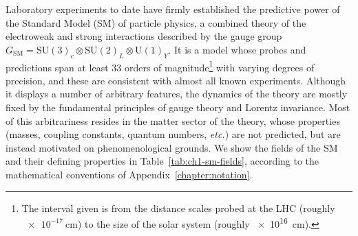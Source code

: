 Laboratory experiments to date have firmly established the predictive power of
the Standard Model (SM) of particle physics, a combined theory of the
electroweak and strong interactions described by the gauge group
$G_{\text{SM}} = \mathrm{SU}(3)_{c} \otimes \mathrm{SU}(2)_{L} \otimes \mathrm{U}(1)_{Y}$.
It is a model whose probes and predictions span at least 33 orders of
magnitude\footnote{The interval given is from the distance scales probed at the
  LHC (roughly $\SI{e-17}{\cm}$) to the size of the solar system (roughly
  \SI{e16}{\cm}).} with varying degrees of precision, and these are consistent
with almost all known experiments. Although it displays a number of arbitrary
features, the dynamics of the theory are mostly fixed by the fundamental
principles of gauge theory and Lorentz invariance. Most of this arbitrariness
resides in the matter sector of the theory, whose properties (masses, coupling
constants, quantum numbers, \textit{etc.}) are not predicted, but are instead
motivated on phenomenological grounds. We show the fields of the SM and their
defining properties in Table~\ref{tab:ch1-sm-fields}, according to the mathematical
conventions of Appendix~\ref{chapter:notation}.
